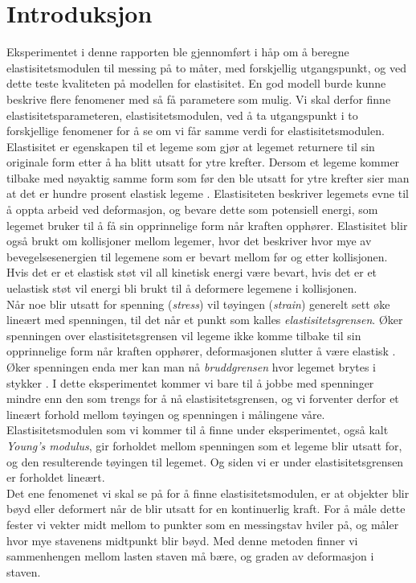 \documentclass[%
 reprint,
 amsmath,amssymb,
 aps,
 norsk,
 booktabs
]{revtex4-1}
\begin{document}
\section{Introduksjon}
Eksperimentet i denne rapporten ble gjennomført i håp om å beregne elastisitetsmodulen til messing på to måter, med forskjellig utgangspunkt, og ved dette teste kvaliteten på modellen for elastisitet. En god modell burde kunne beskrive flere fenomener med så få parametere som mulig. Vi skal derfor finne elastisitetsparameteren, elastisitetsmodulen, ved å ta utgangspunkt i to forskjellige fenomener for å se om vi får samme verdi for elastisitetsmodulen.\\
Elastisitet er egenskapen til et legeme som gjør at legemet returnere til sin originale form etter å ha blitt utsatt  for ytre krefter. Dersom et legeme kommer tilbake med nøyaktig samme form som før den ble utsatt for ytre krefter sier man at det er hundre prosent elastisk legeme \cite{gronn}. Elastisiteten beskriver legemets evne til å oppta arbeid ved deformasjon, og bevare dette som potensiell energi, som legemet bruker til å få sin opprinnelige form når kraften opphører. Elastisitet blir også brukt om kollisjoner mellom legemer, hvor det beskriver hvor mye av bevegelsesenergien til legemene som er bevart mellom før og etter kollisjonen. Hvis det er et elastisk støt vil all kinetisk energi være bevart, hvis det er et uelastisk støt vil energi bli brukt til å deformere legemene i kollisjonen.\\
Når noe blir utsatt for spenning (\textit{stress}) vil tøyingen (\textit{strain}) generelt sett øke lineært med spenningen, til det når et punkt som kalles \textit{elastisitetsgrensen}. Øker spenningen over elastisitetsgrensen vil legeme ikke komme tilbake til sin opprinnelige form når kraften opphører, deformasjonen slutter å være elastisk  \cite{gronn}. Øker spenningen enda mer kan man nå \textit{bruddgrensen} hvor legemet brytes i stykker \cite{gronn}. I dette eksperimentet kommer vi bare til å jobbe med spenninger mindre enn den som trengs for å nå elastisitetsgrensen, og vi forventer derfor et lineært forhold mellom tøyingen og spenningen i målingene våre. Elastisitetsmodulen som vi kommer til å finne under eksperimentet, også kalt \textit{Young's modulus}, gir forholdet mellom spenningen som et legeme blir utsatt for, og den resulterende tøyingen til legemet. Og siden vi er under elastisitetsgrensen er forholdet lineært.\\
Det ene fenomenet vi skal se på for å finne elastisitetsmodulen, er at objekter blir bøyd eller deformert når de blir utsatt for en kontinuerlig kraft. For å måle dette fester vi vekter midt mellom to punkter som en messingstav hviler på, og måler hvor mye stavenens midtpunkt blir bøyd. Med denne metoden finner vi sammenhengen mellom lasten staven må bære, og graden av deformasjon i staven.\\
\end{document}
